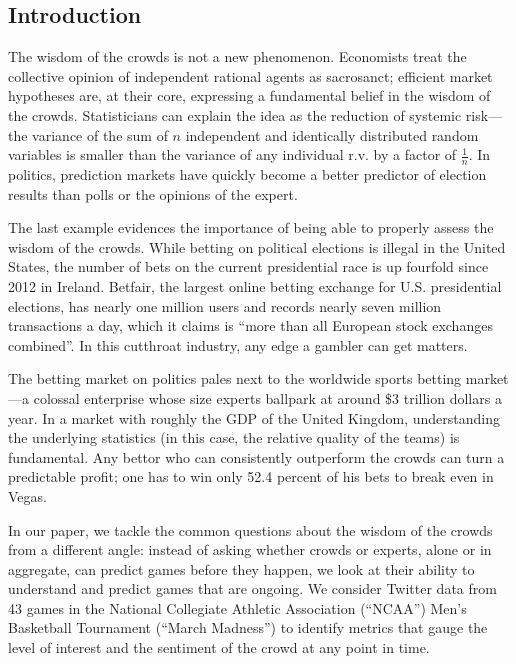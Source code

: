 \documentclass[12pt]{article}
\begin{document}
\newpage

\tableofcontents
\newpage
\begin{doublespacing}

\section{Introduction}

The wisdom of the crowds is not a new phenomenon. Economists treat the collective opinion of independent rational agents as sacrosanct; efficient market hypotheses are, at their core, expressing a fundamental belief in the wisdom of the crowds. Statisticians can explain the idea as the reduction of systemic risk---the variance of the sum of $n$ independent and identically distributed random variables is smaller than the variance of any individual r.v. by a factor of $\frac{1}{n}$. In politics, prediction markets have quickly become a better predictor of election results than polls or the opinions of the expert.

The last example evidences the importance of being able to properly assess the wisdom of the crowds. While betting on political elections is illegal in the United States, the number of bets on the current presidential race is up fourfold since 2012 in Ireland. Betfair, the largest online betting exchange for U.S. presidential elections, has nearly one million users and records nearly seven million transactions a day, which it claims is ``more than all European stock exchanges combined''. In this cutthroat industry, any edge a gambler can get matters. 

The betting market on politics pales next to the worldwide sports betting market---a colossal enterprise whose size experts ballpark at around \$3 trillion dollars a year. In a market with roughly the GDP of the United Kingdom, understanding the underlying statistics (in this case, the relative quality of the teams) is fundamental. Any bettor who can consistently outperform the crowds can turn a predictable profit; one has to win only 52.4 percent of his bets to break even in Vegas. 

In our paper, we tackle the common questions about the wisdom of the crowds from a different angle: instead of asking whether crowds or experts, alone or in aggregate, can predict games before they happen, we look at their ability to understand and predict games that are ongoing. We consider Twitter data from 43 games in the National Collegiate Athletic Association (``NCAA'') Men's Basketball Tournament (``March Madness'') to identify metrics that gauge the level of interest and the sentiment of the crowd at any point in time. 


\end{doublespacing}
\end{document}
